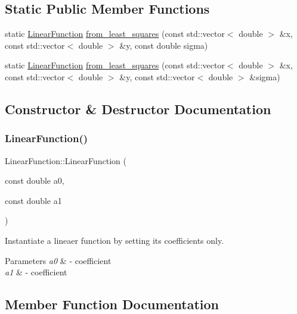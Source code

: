 \subsection*{Static Public Member Functions}
\begin{DoxyCompactItemize}
\item 
static \hyperlink{class_linear_function}{Linear\+Function} \hyperlink{class_linear_function_a02be84eb14f948b2d938f0a9deb9ff37}{from\+\_\+least\+\_\+squares} (const std\+::vector$<$ double $>$ \&x, const std\+::vector$<$ double $>$ \&y, const double sigma)
\item 
static \hyperlink{class_linear_function}{Linear\+Function} \hyperlink{class_linear_function_acb7709ac2cad1206b70dab2a67e9f15e}{from\+\_\+least\+\_\+squares} (const std\+::vector$<$ double $>$ \&x, const std\+::vector$<$ double $>$ \&y, const std\+::vector$<$ double $>$ \&sigma)
\end{DoxyCompactItemize}


\subsection{Constructor \& Destructor Documentation}
\hypertarget{class_linear_function_ad68f82a23780368e83ceb96ec653aac1}{}\label{class_linear_function_ad68f82a23780368e83ceb96ec653aac1} 
\subsubsection{\texorpdfstring{Linear\+Function()}{LinearFunction()}}
{\footnotesize\ttfamily Linear\+Function\+::\+Linear\+Function (\begin{DoxyParamCaption}\item[{const double}]{a0,  }\item[{const double}]{a1 }\end{DoxyParamCaption})}



Instantiate a lineaer function by setting its coefficients only. 


\begin{DoxyParams}{Parameters}
{\em a0} & -\/ coefficient \\
\hline
{\em a1} & -\/ coefficient \\
\hline
\end{DoxyParams}


\subsection{Member Function Documentation}
\hypertarget{class_linear_function_a8913bf6feb840991af9b324c6d46e2eb}{}\label{class_linear_function_a8913bf6feb840991af9b324c6d46e2eb} 
